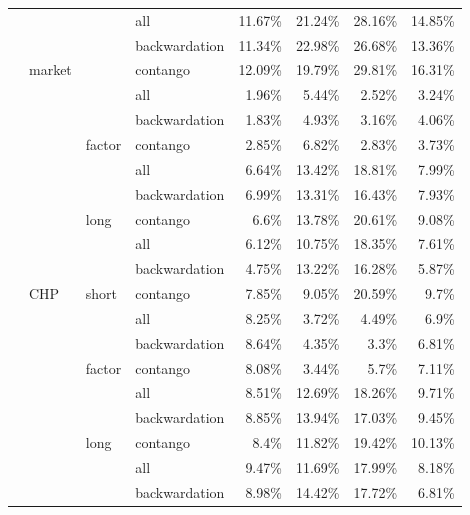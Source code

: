 \documentclass[]{elsarticle} %
\begin{document}
\begin{longtable}[t]{>{}llllrrrr}
\endfoot
\bottomrule
\endlastfoot
 &  &  & all & 11.67\% & 21.24\% & 28.16\% & 14.85\%\\
\nopagebreak
 &  &  & backwardation & 11.34\% & 22.98\% & 26.68\% & 13.36\%\\
\nopagebreak
 & \multirow[t]{-3}{*}{\raggedright\arraybackslash market} &  & contango & 12.09\% & 19.79\% & 29.81\% & 16.31\%\\
\nopagebreak
 &  &  & all & 1.96\% & 5.44\% & 2.52\% & 3.24\%\\
\nopagebreak
 &  &  & backwardation & 1.83\% & 4.93\% & 3.16\% & 4.06\%\\
\nopagebreak
 &  & \multirow[t]{-6}{*}{\raggedright\arraybackslash factor} & contango & 2.85\% & 6.82\% & 2.83\% & 3.73\%\\
\nopagebreak
 &  &  & all & 6.64\% & 13.42\% & 18.81\% & 7.99\%\\
\nopagebreak
 &  &  & backwardation & 6.99\% & 13.31\% & 16.43\% & 7.93\%\\
\nopagebreak
 &  & \multirow[t]{-3}{*}{\raggedright\arraybackslash long} & contango & 6.6\% & 13.78\% & 20.61\% & 9.08\%\\
\nopagebreak
 &  &  & all & 6.12\% & 10.75\% & 18.35\% & 7.61\%\\
\nopagebreak
 &  &  & backwardation & 4.75\% & 13.22\% & 16.28\% & 5.87\%\\
\nopagebreak
 & \multirow[t]{-9}{*}{\raggedright\arraybackslash CHP} & \multirow[t]{-3}{*}{\raggedright\arraybackslash short} & contango & 7.85\% & 9.05\% & 20.59\% & 9.7\%\\
\nopagebreak
 &  &  & all & 8.25\% & 3.72\% & 4.49\% & 6.9\%\\
\nopagebreak
 &  &  & backwardation & 8.64\% & 4.35\% & 3.3\% & 6.81\%\\
\nopagebreak
 &  & \multirow[t]{-3}{*}{\raggedright\arraybackslash factor} & contango & 8.08\% & 3.44\% & 5.7\% & 7.11\%\\
\nopagebreak
 &  &  & all & 8.51\% & 12.69\% & 18.26\% & 9.71\%\\
\nopagebreak
 &  &  & backwardation & 8.85\% & 13.94\% & 17.03\% & 9.45\%\\
\nopagebreak
 &  & \multirow[t]{-3}{*}{\raggedright\arraybackslash long} & contango & 8.4\% & 11.82\% & 19.42\% & 10.13\%\\
\nopagebreak
 &  &  & all & 9.47\% & 11.69\% & 17.99\% & 8.18\%\\
\nopagebreak
 &  &  & backwardation & 8.98\% & 14.42\% & 17.72\% & 6.81\%\\

\end{longtable}
\end{document}
